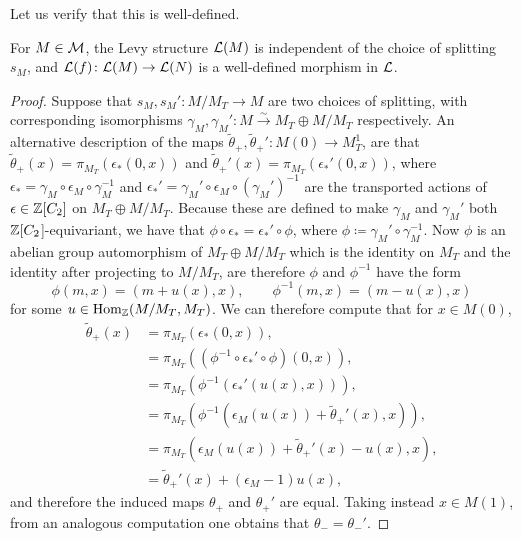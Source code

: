 Let us verify that this is well-defined.

\begin{lemma}
  For $M \in {\mathcal M}$, the Levy structure ${\mathcal L}(M)$ is independent of the choice of splitting $s_M$, and ${\mathcal L}(f) \colon {\mathcal L}(M) \rightarrow {\mathcal L}(N)$ is a well-defined morphism in ${\mathcal L}$.
\end{lemma}

\begin{proof}
  Suppose that $s_M, s_M' \colon M / M_T \rightarrow M$ are two choices of splitting, with corresponding isomorphisms $\gamma_M, \gamma_M' \colon M \xrightarrow{\sim} M_T \oplus M/ M_T$ respectively. An alternative description of the maps $\widetilde{\theta}_+, \widetilde{\theta}_+' \colon M(0) \rightarrow M_T^1$, are that $\widetilde{\theta}_+(x) = \pi_{M_T} (\epsilon_*(0,x))$ and $\widetilde{\theta}_+'(x) = \pi_{M_T} (\epsilon_*'(0,x))$, where $\epsilon_* = \gamma_M \circ \epsilon_M \circ \gamma_M^{-1}$ and $\epsilon_*' = \gamma_M' \circ \epsilon_M \circ (\gamma_M')^{-1}$ are the transported actions of $\epsilon \in {\mathbb Z}[C_2]$ on $M_T \oplus M / M_T$. Because these are defined to make $\gamma_M$ and $\gamma_M'$ both ${\mathbb Z}[C_2$]-equivariant, we have that $\phi \circ \epsilon_* = \epsilon_*' \circ \phi$, where $\phi \coloneqq \gamma_M' \circ \gamma_M^{-1}$. Now $\phi$ is an abelian group automorphism of $M_T \oplus M / M_T$ which is the identity on $M_T$ and the identity after projecting to $M / M_T$, are therefore $\phi$ and $\phi^{-1}$ have the form
  \[
  \phi(m, x) = (m + u(x), x), \qquad \phi^{-1}(m,x) = (m - u(x), x)
  \]
  for some $u \in \operatorname{Hom}_{{\mathbb Z}}(M/M_T, M_T)$. We can therefore compute that for $x \in M(0)$, 
  \begin{align*}
    \widetilde{\theta}_+(x) &= \pi_{M_T} (\epsilon_*(0,x)), \\
    &= \pi_{M_T}((\phi^{-1} \circ \epsilon_*' \circ \phi)(0,x)), \\
    &= \pi_{M_T}(\phi^{-1} (\epsilon_*'(u(x), x))), \\
    &= \pi_{M_T}(\phi^{-1} (\epsilon_M(u(x)) + \widetilde{\theta}_+'(x), x)), \\
    &= \pi_{M_T}(\epsilon_M(u(x)) + \widetilde{\theta}_+'(x) - u(x), x), \\
    &= \widetilde{\theta}_+'(x) + (\epsilon_M - 1)u(x),
  \end{align*}
  and therefore the induced maps $\theta_+$ and $\theta_+'$ are equal. Taking instead $x \in M(1)$, from an analogous computation one obtains that $\theta_- = \theta_-'$. 
  

\end{proof}
